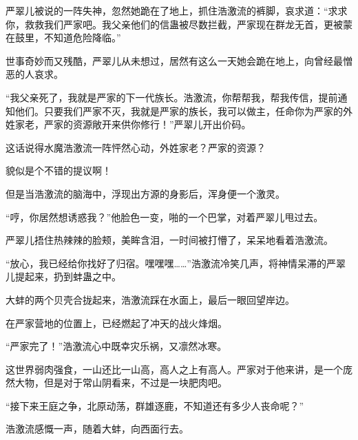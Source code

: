 \begin{this_body}
严翠儿被说的一阵失神，忽然她跪在了地上，抓住浩激流的裤脚，哀求道：“求求你，救救我们严家吧。我父亲他们的信蛊被尽数拦截，严家现在群龙无首，更被蒙在鼓里，不知道危险降临。”

世事奇妙而又残酷，严翠儿从未想过，居然有这么一天她会跪在地上，向曾经最憎恶的人哀求。

“我父亲死了，我就是严家的下一代族长。浩激流，你帮帮我，帮我传信，提前通知他们。只要我们严家不灭，我就是严家的族长，我可以做主，任命你为严家的外姓家老，严家的资源敞开来供你修行！”严翠儿开出价码。

这话说得水魔浩激流一阵怦然心动，外姓家老？严家的资源？

貌似是个不错的提议啊！

但是当浩激流的脑海中，浮现出方源的身影后，浑身便一个激灵。

“哼，你居然想诱惑我？”他脸色一变，啪的一个巴掌，对着严翠儿甩过去。

严翠儿捂住热辣辣的脸颊，美眸含泪，一时间被打懵了，呆呆地看着浩激流。

“放心，我已经给你找好了归宿。嘿嘿嘿……”浩激流冷笑几声，将神情呆滞的严翠儿提起来，扔到蚌蛊之中。

大蚌的两个贝壳合拢起来，浩激流踩在水面上，最后一眼回望岸边。

在严家营地的位置上，已经燃起了冲天的战火烽烟。

“严家完了！”浩激流心中既幸灾乐祸，又凛然冰寒。

这世界弱肉强食，一山还比一山高，高人之上有高人。严家对于他来讲，是一个庞然大物，但是对于常山阴看来，不过是一块肥肉吧。

“接下来王庭之争，北原动荡，群雄逐鹿，不知道还有多少人丧命呢？”

浩激流感慨一声，随着大蚌，向西面行去。

\end{this_body}

